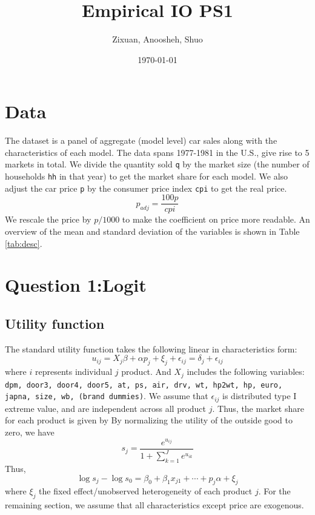 \documentclass[12pt]{article}
\title{Empirical IO PS1}
\author{Zixuan, Anoosheh, Shuo}
\date{\today}
\begin{document}
\maketitle

\setcounter{page}{1}
\section{Data}
The dataset is a panel of aggregate (model level) car sales along with the
characteristics of each model. The data spans 1977-1981 in the U.S., give rise
to 5 markets in total. We divide the quantity sold \verb|q| by the market size
(the number of households \verb|hh| in that year) to get the market share for
each model. We also adjust the car price \verb|p| by the consumer price index
\verb|cpi| to get the real price.
\begin{equation*}
    p_{adj} = \frac{100 p}{cpi}
\end{equation*}
We rescale the price by $p/1000$ to make the coefficient on price more readable.
An overview of the mean and standard deviation of the variables is shown in Table \ref{tab:desc}.


\section{Question 1:Logit}
\subsection{Utility function}
The standard utility function takes the following linear in characteristics
form:
\begin{equation}
    u_{ij}=X_{j}\beta + \alpha p_{j} + \xi_{j}+ \epsilon_{ij}=\delta_j+\epsilon_{ij}
\end{equation}
where $i$ represents individual $j$ product. And $X_{j}$ includes the following variables:\\
\verb|dpm, door3, door4, door5, at, ps, air, drv, wt, hp2wt, hp, euro, japna, size, wb, (brand dummies)|.
We assume that $\epsilon_{ij}$ is distributed type I extreme value, and are independent across all product $j$. Thus, the market share for each product is given by
By normalizing the utility of the outside good to zero, we have
\begin{equation*}
    s_j=\frac{e^{u_{ij}}}{1+\sum_{k=1}^{J}e^{u_{ik}}}
\end{equation*}
Thus,
\begin{equation}\label{eq:logit}
    \log s_j-\log s_0=\beta_0+\beta_1x_{j1}+\cdots+p_j\alpha+\xi_j
\end{equation}
where $\xi_j$ the fixed effect/unobserved heterogeneity of each product $j$.
For the remaining section, we assume that all characteristics except price are exogenous.
\end{document}
